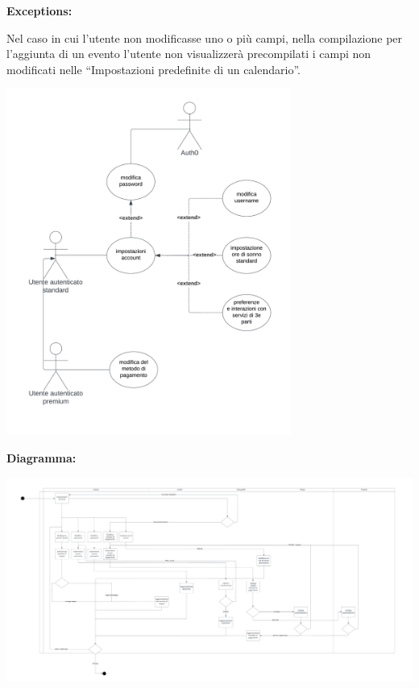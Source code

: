 \begin{listaPersonale}[UC]{}
    \textbf{Exceptions:}
    \begin{enumerate}[label=\textbf{[exception \arabic{enumii}]}, ref= \textbf{[exception \arabic{enumii}]}]
         Nel caso in cui l'utente non modificasse uno o più campi, nella compilazione per l'aggiunta di un evento l'utente non visualizzerà precompilati i campi non modificati nelle “Impostazioni predefinite di un calendario”.
    \end{enumerate}





    \newpage

    \begin{center}
        \includegraphics[width=0.7\textwidth]{img/Diagrammi/UseCases/ImpostazioniAccount.png}
    \end{center}


    \textbf{Diagramma:}
    \begin{center}
        \includegraphics[width=1\textwidth]{img/Diagrammi/DS/DS_ImpostazioneAccount.png}
    \end{center}





\end{listaPersonale}
